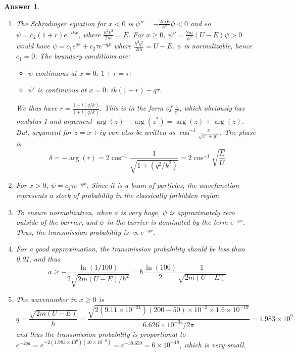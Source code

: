 \documentclass[a4paper]{article}
\newtheorem{ans}{Answer}[subsection]
\theoremstyle{new}
\begin{document}
\begin{ans}\leavevmode
\begin{enumerate}[label=(\roman*)]
\item The Schrodinger equation for $x<0$ is $\psi''=-\frac{2mE}{\hbar^2}\psi<0$ and so $\psi=c_2(1+r)e^{-ikx}$, where $\frac{\hbar^2k^2}{2m}=E$. For $x\geq0$, $\psi''=\frac{2m}{\hbar^2}(U-E)\psi>0$ would have $\psi=c_1e^{qx}+c_2\tau e^{-qx}$ where $\frac{\hbar^2q^2}{2m}=U-E$. $\psi$ is normalizable, hence $c_1=0$. The boundary conditions are:
\begin{itemize}
    \item $\psi$ continuous at $x=0$: $1+r=\tau$;
    \item $\psi'$ is continuous at $x=0$: $ik(1-r)-q\tau$.
\end{itemize}
We thus have $r=\frac{1-i(q/k)}{1+i(q/k)}$. This is in the form of $\frac{z}{z^*}$, which obviously has modulus 1 and argument $\arg(z)-\arg(z^*)=\arg(z)+\arg(z)$. But, argument for $z=x+iy$ can also be written as $\cos^{-1}\frac{x}{\sqrt{x^2+y^2}}$. The phase is 
$$\delta=-\arg(r)=2\cos^{-1}\frac{1}{\sqrt{1+(q^2/k^2)}}=2\cos^{-1}\sqrt{\frac{E}{U}}$$
\item For $x>0$, $\psi=c_2\tau e^{-qx}$. Since it is a beam of particles, the wavefunction represents a stock of probability in the classically forbidden region.
\item To ensure normalization, when $a$ is very huge, $\psi$ is approximately zero outside of the barrier, and $\psi$ in the barrier is dominated by the term $e^{-qx}$. Thus, the transmission probability is $\propto e^{-qx}$.
\item For a good approximation, the transmission probability should be less than 0.01, and thus
$$a\geq-\frac{\ln(1/100)}{2\sqrt{2m(U-E)/\hbar^2}}=\hbar\frac{\ln(100)}{2}\frac{1}{\sqrt{2m(U-E)}}$$
\item The wavenumber in $x\geq 0$ is
$$q=\frac{\sqrt{2m(U-E)}}{\hbar}=\frac{\sqrt{2(9.11\times10^{-31})(200-50)\times10^{-3}\times 1.6\times10^{-19}}}{6.626\times10^{-34}/2\pi}=1.983\times10^9$$
and thus the transmission probability is proportional to $e^{-2qa}=e^{-2(1.983\times 10^9)(10\times10^{-9})}=e^{-39.659}=6\times10^{-18}$, which is very small.
\end{enumerate}
\end{ans}
\newpage
\end{document}
